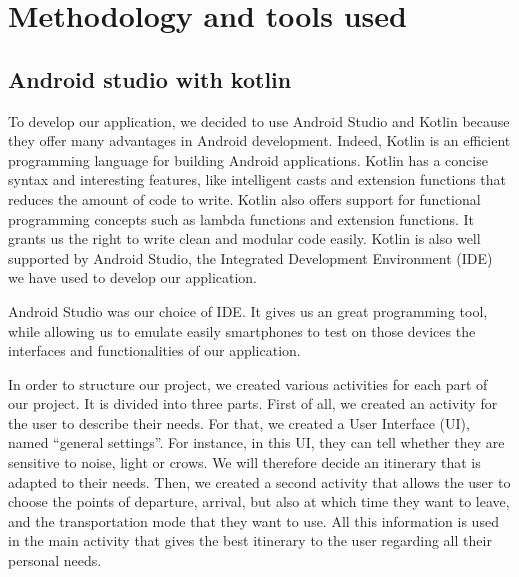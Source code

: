 
\section{Methodology and tools used}

\subsection{Android studio with kotlin}
To develop our application, we decided to use Android Studio and Kotlin because they offer many advantages in Android development. Indeed, Kotlin is an efficient programming language for building Android applications. 
Kotlin has a concise syntax and interesting features, like intelligent casts and extension functions that reduces the amount of code to write.
Kotlin also offers support for functional programming concepts such as lambda functions and extension functions. It grants us the right to write clean and modular code easily. Kotlin is also well supported by Android Studio, the Integrated Development Environment (IDE) we have used to develop our application.\newline

Android Studio was our choice of IDE. It gives us an great programming tool, while allowing us to emulate easily smartphones to test on those devices the interfaces and functionalities of our application. \newline

In order to structure our project, we created various activities for each part of our project. It is divided into three parts. First of all, we created an activity for the user to describe their needs. For that, we created a User Interface (UI), named “general settings”. For instance, in this UI, they can tell whether they are sensitive to noise, light or crows. We will therefore decide an itinerary that is adapted to their needs. Then, we created a second activity that allows the user to choose the points of departure, arrival, but also at which time they want to leave, and the transportation mode that they want to use. All this information is used in the main activity that gives the best itinerary to the user regarding all their personal needs. \newline


